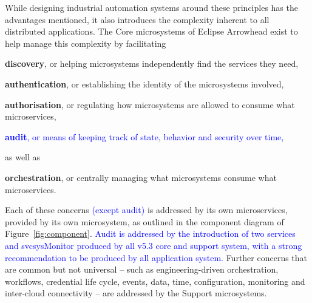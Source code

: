 \documentclass[a4paper]{arrowhead}
\newcommand{\svc}[1]{\textcolor{ArrowheadPurple}{\textit{\ahbreak{#1}}}}    %
\begin{document}
While designing industrial automation systems around these principles has the advantages
mentioned, it also introduces the complexity inherent to all distributed applications. The
Core microsystems of Eclipse Arrowhead exist to help manage this complexity by facilitating
\begin{itemize}
  \item \textbf{discovery}, or helping microsystems independently find the services they need,
  \item \textbf{authentication}, or establishing the identity of the microsystems involved,
  \item \textbf{authorisation}, or regulating how microsystems are allowed to consume what
    microservices,
  \textcolor{blue}{\item \textbf{audit}, or means of keeping track of state,
    behavior and security over time,}  as well as
  \item \textbf{orchestration}, or centrally managing what microsystems consume what
        microservices.
\end{itemize}
Each of these concerns \textcolor{blue}{(except audit)} is addressed
by its own microservices, provided by its own microsystem, as outlined in the component diagram of
Figure~\ref{fig:component}. \textcolor{blue}{Audit is addressed by the introduction of
two services \svc{generalManagement} and svc{sysMonitor}
produced by all v5.3 core and support system, with a strong recommendation
to be produced by all application system.} Further concerns that are common
but not universal -- such as engineering-driven orchestration, workflows, credential life cycle,
events, data, time, configuration, monitoring and inter-cloud connectivity -- are addressed by the
Support microsystems.
\end{document}
